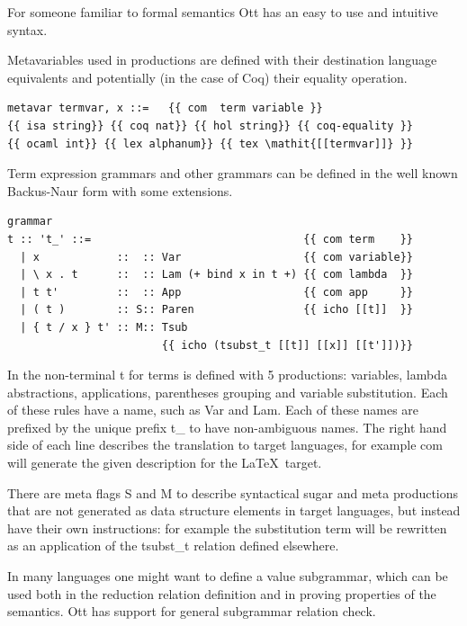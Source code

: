 \documentclass[12pt,twoside,notitlepage]{report}
\begin{document}
For someone familiar to formal semantics Ott has an easy to use and intuitive syntax. 

Metavariables used in productions are defined with their destination language equivalents and potentially (in the case of Coq) their equality operation.

\begin{lstlisting}[language={Ott}, caption={Ott metavariable definition}]
metavar termvar, x ::=   {{ com  term variable }} 
{{ isa string}} {{ coq nat}} {{ hol string}} {{ coq-equality }}
{{ ocaml int}} {{ lex alphanum}} {{ tex \mathit{[[termvar]]} }}
\end{lstlisting}


Term expression grammars and other grammars can be defined in the well known Backus-Naur form with some extensions.


\begin{lstlisting}[language={Ott}, caption={Ott grammar example}, label={lst:ottgrammarex}]
grammar
t :: 't_' ::=                                 {{ com term    }}
  | x            ::  :: Var                   {{ com variable}}
  | \ x . t      ::  :: Lam (+ bind x in t +) {{ com lambda  }}
  | t t'         ::  :: App                   {{ com app     }}
  | ( t )        :: S:: Paren                 {{ icho [[t]]  }} 
  | { t / x } t' :: M:: Tsub  
                        {{ icho (tsubst_t [[t]] [[x]] [[t']])}}
\end{lstlisting}


In  the non-terminal t for terms is defined with 5 productions: variables, lambda abstractions, applications, parentheses grouping and variable substitution. Each of these rules have a name, such as Var and Lam. Each of these names are prefixed by the unique prefix t\_ to have non-ambiguous names. The right hand side of each line describes the translation to target languages, for example com will  generate the given description for the \LaTeX\, target. 

There are meta flags S and M to describe syntactical sugar and meta productions that are not generated as data structure elements in target languages, but instead have their own instructions: for example the substitution term will be rewritten as an application of the tsubst\_t relation defined elsewhere. 

In many languages one might want to define a value subgrammar, which can be used both in the reduction relation definition and in proving properties of the semantics. Ott has support for general subgrammar relation check.
\end{document}
